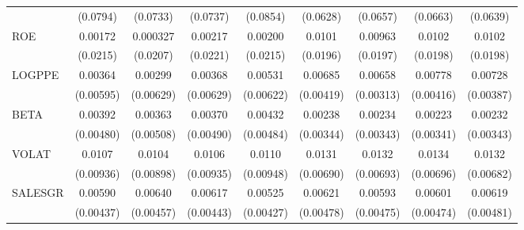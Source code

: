 \begin{table}[htbp]
\begin{tabular}{l*{8}{c}}
                    &    (0.0794)         &    (0.0733)         &    (0.0737)         &    (0.0854)         &    (0.0628)         &    (0.0657)         &    (0.0663)         &    (0.0639)         \\
ROE                 &     0.00172         &    0.000327         &     0.00217         &     0.00200         &      0.0101         &     0.00963         &      0.0102         &      0.0102         \\
                    &    (0.0215)         &    (0.0207)         &    (0.0221)         &    (0.0215)         &    (0.0196)         &    (0.0197)         &    (0.0198)         &    (0.0198)         \\
LOGPPE              &     0.00364         &     0.00299         &     0.00368         &     0.00531         &     0.00685         &     0.00658\sym{*}  &     0.00778\sym{*}  &     0.00728\sym{*}  \\
                    &   (0.00595)         &   (0.00629)         &   (0.00629)         &   (0.00622)         &   (0.00419)         &   (0.00313)         &   (0.00416)         &   (0.00387)         \\
BETA                &     0.00392         &     0.00363         &     0.00370         &     0.00432         &     0.00238         &     0.00234         &     0.00223         &     0.00232         \\
                    &   (0.00480)         &   (0.00508)         &   (0.00490)         &   (0.00484)         &   (0.00344)         &   (0.00343)         &   (0.00341)         &   (0.00343)         \\
VOLAT               &      0.0107         &      0.0104         &      0.0106         &      0.0110         &      0.0131\sym{*}  &      0.0132\sym{*}  &      0.0134\sym{*}  &      0.0132\sym{*}  \\
                    &   (0.00936)         &   (0.00898)         &   (0.00935)         &   (0.00948)         &   (0.00690)         &   (0.00693)         &   (0.00696)         &   (0.00682)         \\
SALESGR             &     0.00590         &     0.00640         &     0.00617         &     0.00525         &     0.00621         &     0.00593         &     0.00601         &     0.00619         \\
                    &   (0.00437)         &   (0.00457)         &   (0.00443)         &   (0.00427)         &   (0.00478)         &   (0.00475)         &   (0.00474)         &   (0.00481)         \\

\end{tabular}
\end{table}

